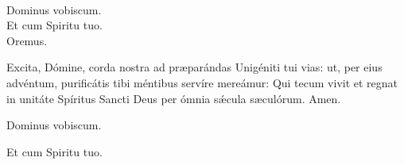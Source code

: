 \\
  \rubric{\Vbar}Dominus vobiscum.
\\
  \rubric{\Rbar}Et cum Spiritu tuo.
\\
Oremus.

Excita, Dómine, corda nostra ad præparándas Unigéniti tui vias: ut, per eius advéntum, purificátis tibi méntibus servíre mereámur: Qui tecum vivit et regnat in unitáte Spíritus Sancti Deus per ómnia sǽcula sæculórum.\rubric{\Rbar} Amen.

  \rubric{\Vbar}Dominus vobiscum.

  \rubric{\Rbar}Et cum Spiritu tuo.

